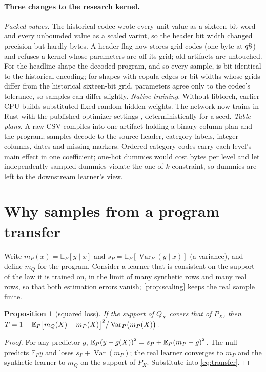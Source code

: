 \documentclass{article}
\newtheorem{proposition}{Proposition}
\theoremstyle{remark}
\newcommand{\E}{\mathbb{E}}
\newcommand{\Var}{\operatorname{Var}}
\newcommand{\Sq}[1]{{#1}^{\Two}}
\begin{document}
\paragraph{Three changes to the research kernel.} \emph{Packed values.} The historical codec wrote every unit
value as a sixteen-bit word and every unbounded value as a scaled varint, so the header bit width changed
precision but hardly bytes. A header flag now stores grid codes (one byte at $q8$) and refuses a
kernel whose parameters are off its grid; old artifacts are untouched. For the headline shape the decoded
program, and so every sample, is bit-identical to the historical encoding; for shapes with copula edges or
bit widths whose grids differ from the historical sixteen-bit grid, parameters agree only to the codec's
tolerance, so samples can differ slightly. \emph{Native training.} Without libtorch, earlier CPU builds substituted fixed random
hidden weights. The network now trains in Rust with the published optimizer settings
\citep{loshchilov2019decoupled}, deterministically for a seed. \emph{Table plans.} A raw CSV compiles into
one artifact holding a binary column plan and the program; samples decode to the source header, category
labels, integer columns, dates and missing markers. Ordered category codes carry each level's main effect
in one coefficient; one-hot dummies would cost bytes per level and let independently sampled dummies
violate the one-of-$k$ constraint, so dummies are left to the downstream learner's view.

\section{Why samples from a program transfer}
\label{sec:theory}

Write $m_P(x) = \E_P[y \mid x]$ and $s_P = \E_P[\Var_P(y\mid x)]$ (a variance), and define $m_Q$ for the
program. Consider a learner that is consistent on the support of the law it is trained on, in the limit of
many synthetic rows and many real rows, so that both estimation errors vanish; \cref{prop:scaling} keeps
the real sample finite.

\begin{proposition}[squared loss]
\label{prop:squared}
If the support of $Q_X$ covers that of $P_X$, then
$T = \One - \E_P\Sq{\bigl[m_Q(X) - m_P(X)\bigr]} \big/ \Var_P\bigl(m_P(X)\bigr)$.
\end{proposition}
\begin{proof}
For any predictor $g$, $\E_P\Sq{(y - g(X))} = s_P + \E_P\Sq{(m_P - g)}$. The null predicts $\E_P y$ and
loses $s_P + \Var(m_P)$; the real learner converges to $m_P$ and the synthetic learner to $m_Q$ on the
support of $P_X$. Substitute into \eqref{eq:transfer}.
\end{proof}
\end{document}
